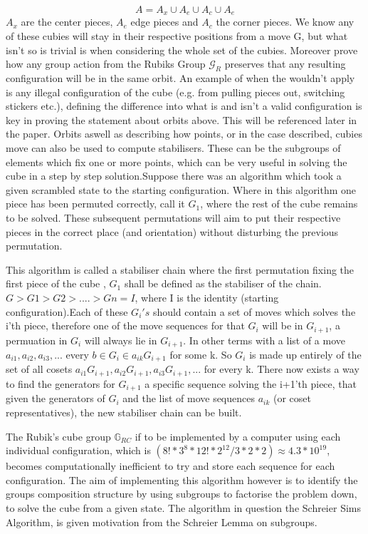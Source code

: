 \documentclass{article}
\newcounter{lem}[section]\setcounter{lem}{0}
\begin{document}
\begin{equation}
A = A_{x}\cup A_{e}\cup A_{c}\cup A_{e}
\end{equation} 
$A_{x}$ are the center pieces, $A_{e}$ edge pieces and $A_{c}$ the corner pieces. We know any of these cubies will stay in their respective positions from a move G, but what isn't so is trivial is when considering the whole set of the cubies. Moreover prove how any group action from the Rubiks Group $\mathcal{G}_{R}$ preserves that any resulting configuration will be in the same orbit. 
An example of when the wouldn't apply is any illegal configuration of the cube (e.g. from pulling pieces out, switching stickers etc.), defining the difference into what is and isn't a valid configuration is key in proving the statement about orbits above. This will be referenced later in the paper.
Orbits aswell as describing how points, or in the case described, cubies move can also be used to compute stabilisers. These can be the subgroups of elements which fix one or more points, which can be very useful in solving the cube in a step by step solution\cite{PermGroups}.\newline Suppose there was an algorithm which took a given scrambled state to the starting configuration. Where in this algorithm one piece has been permuted correctly, call it $G_{1}$, where the rest of the cube remains to be solved. These subsequent permutations will aim to put their respective pieces in the correct place (and orientation) without disturbing the previous permutation.   

This algorithm is called a stabiliser chain where the first permutation fixing the first piece of the cube , $G_{1}$ shall be defined as the stabiliser of the chain.  $G > G1 > G2 > .... > Gn = I$, where I is the identity (starting configuration).Each of these $G_{i}'s$ should contain a set of moves which solves the i'th piece, therefore one of the move sequences for that $G_{i}$ will be in $G_{i+1}$, a permuation in $G_{i}$ will always lie in $G_{i+1}$. In other terms with a list  of a move $a_{i1},a_{i2},a_{i3}, ...$ every $b \in G_{i} \in a_{ik}G_{i+1}$ for some k. So $G_{i}$ is made up entirely of the set of all cosets $a_{i1}G_{i+1}, a_{i2}G_{i+1}, a_{i3}G_{i+1}, ... $ for every k. There now exists a way to find the generators for $G_{i+1}$ a specific sequence solving the i+1'th piece, that given the generators of $G_{i}$ and the list of move sequences $a_{ik}$ (or coset representatives), the new stabiliser chain can be built.\cite{Schreier}

The Rubik's cube group $\mathbb{G}_{RC}$ if to be implemented by a computer using each individual configuration, which is $(8!*3^8*12!*2^12/3*2*2) \approx 4.3*10^{19}$, becomes computationally inefficient to try and store each sequence for each configuration. The aim of implementing this algorithm however is to identify the groups composition structure by using subgroups to factorise the problem down, to solve the cube from a given state. The algorithm in question the Schreier Sims Algorithm, is given motivation from the Schreier Lemma on subgroups.
\end{document}
